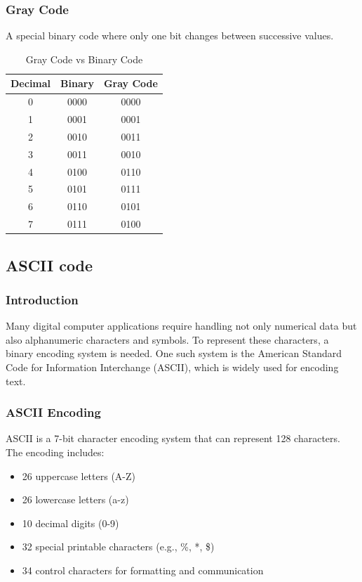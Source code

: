 \documentclass[a4paper,12pt]{article}
\begin{document}
\subsubsection{Gray Code}
A special binary code where only one bit changes between successive values.

\begin{table}[h]
    \centering
    \begin{tabular}{|c|c|c|}
        \hline
        \textbf{Decimal} & \textbf{Binary} & \textbf{Gray Code} \\
        \hline
        0 & 0000 & 0000 \\
        1 & 0001 & 0001 \\
        2 & 0010 & 0011 \\
        3 & 0011 & 0010 \\
        4 & 0100 & 0110 \\
        5 & 0101 & 0111 \\
        6 & 0110 & 0101 \\
        7 & 0111 & 0100 \\
        \hline
    \end{tabular}
    \caption{Gray Code vs Binary Code}
\end{table}
\subsection{ASCII code}
\subsubsection{Introduction}
Many digital computer applications require handling not only numerical data but also alphanumeric characters and symbols. To represent these characters, a binary encoding system is needed. One such system is the American Standard Code for Information Interchange (ASCII), which is widely used for encoding text.

\subsubsection{ASCII Encoding}
ASCII is a 7-bit character encoding system that can represent 128 characters. The encoding includes:
\begin{itemize}
    \item 26 uppercase letters (A-Z)
    \item 26 lowercase letters (a-z)
    \item 10 decimal digits (0-9)
    \item 32 special printable characters (e.g., \%, *, \$)
    \item 34 control characters for formatting and communication
\end{itemize}
\end{document}
